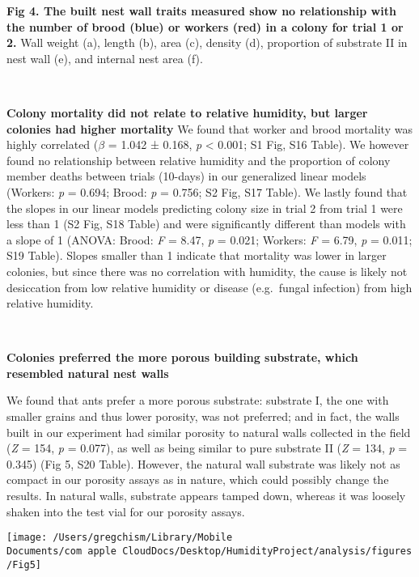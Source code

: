 \documentclass[3p]{elsarticle} %
\begin{document}
\textbf{Fig 4. The built nest wall traits measured show no relationship
with the number of brood (blue) or workers (red) in a colony for trial 1
or 2.} Wall weight (a), length (b), area (c), density (d), proportion of
substrate II in nest wall (e), and internal nest area (f).

~

\textbf{Colony mortality did not relate to relative humidity, but larger
colonies had higher mortality } We found that worker and brood mortality
was highly correlated (\(\beta\) = 1.042 ± 0.168, \emph{p} \textless{}
0.001; S1 Fig, S16 Table). We however found no relationship between
relative humidity and the proportion of colony member deaths between
trials (10-days) in our generalized linear models (Workers: \emph{p} =
0.694; Brood: \emph{p} = 0.756; S2 Fig, S17 Table). We lastly found that
the slopes in our linear models predicting colony size in trial 2 from
trial 1 were less than 1 (S2 Fig, S18 Table) and were significantly
different than models with a slope of 1 (ANOVA: Brood: \emph{F} = 8.47,
\emph{p} = 0.021; Workers: \emph{F} = 6.79, \emph{p} = 0.011; S19
Table). Slopes smaller than 1 indicate that mortality was lower in
larger colonies, but since there was no correlation with humidity, the
cause is likely not desiccation from low relative humidity or disease
(e.g.~fungal infection) from high relative humidity.

~

\textbf{Colonies preferred the more porous building substrate, which
resembled natural nest walls}

We found that ants prefer a more porous substrate: substrate I, the one
with smaller grains and thus lower porosity, was not preferred; and in
fact, the walls built in our experiment had similar porosity to natural
walls collected in the field (\emph{Z} = 154, \emph{p} = 0.077), as well
as being similar to pure substrate II (\emph{Z} = 134, \emph{p} = 0.345)
(Fig 5, S20 Table). However, the natural wall substrate was likely not
as compact in our porosity assays as in nature, which could possibly
change the results. In natural walls, substrate appears tamped down,
whereas it was loosely shaken into the test vial for our porosity
assays.

\begin{flushleft}\texttt{[image: /Users/gregchism/Library/Mobile Documents/com~apple~CloudDocs/Desktop/HumidityProject/analysis/figures/Fig5]} \end{flushleft}
\end{document}

